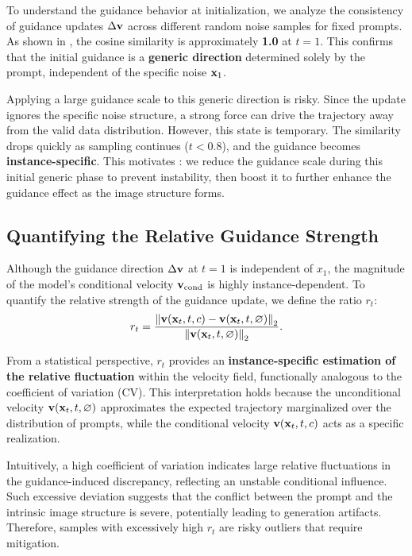 To understand the guidance behavior at initialization, we analyze the consistency of guidance updates $\Delta \vel$ across different random noise samples for fixed prompts. As shown in , the cosine similarity is approximately \textbf{1.0} at $t=1$. This confirms that the initial guidance is a \textbf{generic direction} determined solely by the prompt, independent of the specific noise $\x_1$.

Applying a large guidance scale to this generic direction is risky. Since the update ignores the specific noise structure, a strong force can drive the trajectory away from the valid data distribution. However, this state is temporary. The similarity drops quickly as sampling continues ($t < 0.8$), and the guidance becomes \textbf{instance-specific}. This motivates \mtdbk: we reduce the guidance scale during this initial generic phase to prevent instability, then boost it to further enhance the guidance effect as the image structure forms.


\subsection{Quantifying the Relative Guidance Strength}
Although the guidance direction $\Delta \vel$ at $t=1$ is independent of $x_1$, the magnitude of the model's conditional velocity $\vel_{\cond}$ is highly instance-dependent. To quantify the relative strength of the guidance update, we define the ratio $r_t$:
\begin{equation}
    r_t = \frac{\norm[2]{\vel(\x_t, t, c) - \vel(\x_t, t, \varnothing)}}{\norm[2]{\vel(\x_t, t, \varnothing)}}.
    \label{eq:ratio}
\end{equation}

From a statistical perspective, $r_t$ provides an \textbf{instance-specific estimation of the relative fluctuation} within the velocity field, functionally analogous to the coefficient of variation (CV). 
This interpretation holds because the unconditional velocity $\vel(\x_t, t, \varnothing)$ approximates the expected trajectory marginalized over the distribution of prompts, while the conditional velocity $\vel(\x_t, t, c)$ acts as a specific realization. 

Intuitively, a high coefficient of variation indicates large relative fluctuations in the guidance-induced discrepancy, reflecting an unstable conditional influence. Such excessive deviation suggests that the conflict between the prompt and the intrinsic image structure is severe, potentially leading to generation artifacts. Therefore, samples with excessively high $r_t$ are risky outliers that require mitigation. 

